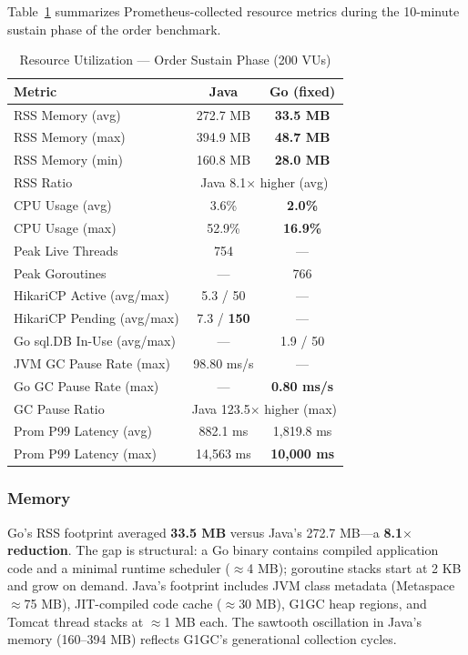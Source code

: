 \documentclass[conference]{IEEEtran}
\begin{document}
Table~\ref{tab:resource_results} summarizes Prometheus-collected resource metrics during the 10-minute sustain phase of the order benchmark.

\begin{table}[htbp]
\caption{Resource Utilization --- Order Sustain Phase (200 VUs)}
\begin{center}
\begin{tabular}{|l|c|c|}
\hline
\textbf{Metric} & \textbf{Java} & \textbf{Go (fixed)} \\
\hline
RSS Memory (avg)           & 272.7 MB    & \textbf{33.5 MB} \\
RSS Memory (max)           & 394.9 MB    & \textbf{48.7 MB} \\
RSS Memory (min)           & 160.8 MB    & \textbf{28.0 MB} \\
RSS Ratio                  & \multicolumn{2}{c|}{Java 8.1$\times$ higher (avg)} \\
\hline
CPU Usage (avg)            & 3.6\%       & \textbf{2.0\%} \\
CPU Usage (max)            & 52.9\%      & \textbf{16.9\%} \\
\hline
Peak Live Threads          & 754         & --- \\
Peak Goroutines            & ---         & 766 \\
\hline
HikariCP Active (avg/max)  & 5.3 / 50   & --- \\
HikariCP Pending (avg/max) & 7.3 / \textbf{150} & --- \\
Go sql.DB In-Use (avg/max) & ---         & 1.9 / 50 \\
\hline
JVM GC Pause Rate (max)    & 98.80 ms/s  & --- \\
Go GC Pause Rate (max)     & ---         & \textbf{0.80 ms/s} \\
GC Pause Ratio             & \multicolumn{2}{c|}{Java 123.5$\times$ higher (max)} \\
\hline
Prom P99 Latency (avg)     & 882.1 ms  & 1,819.8 ms \\
Prom P99 Latency (max)     & 14,563 ms   & \textbf{10,000 ms} \\
\hline
\end{tabular}
\label{tab:resource_results}
\end{center}
\end{table}

\subsubsection{Memory}
Go's RSS footprint averaged \textbf{33.5 MB} versus Java's 272.7 MB---a \textbf{8.1$\times$ reduction}. The gap is structural: a Go binary contains compiled application code and a minimal runtime scheduler ($\approx$4 MB); goroutine stacks start at 2 KB and grow on demand. Java's footprint includes JVM class metadata (Metaspace $\approx$75 MB), JIT-compiled code cache ($\approx$30 MB), G1GC heap regions, and Tomcat thread stacks at $\approx$1 MB each. The sawtooth oscillation in Java's memory (160--394 MB) reflects G1GC's generational collection cycles.
\end{document}
